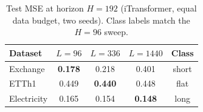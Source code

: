\begin{table}[h]
\caption{Test MSE at horizon $H{=}192$ (iTransformer, equal data budget, two seeds). Class labels match the $H{=}96$ sweep.}
\label{tab:horizon}
\centering\small
\begin{tabular}{lcccc}
\toprule
Dataset & $L{=}96$ & $L{=}336$ & $L{=}1440$ & Class \\
\midrule
Exchange & \textbf{0.178} & 0.218 & 0.401 & short \\
ETTh1 & 0.449 & \textbf{0.440} & 0.448 & flat \\
Electricity & 0.165 & 0.154 & \textbf{0.148} & long \\
\bottomrule
\end{tabular}
\end{table}
